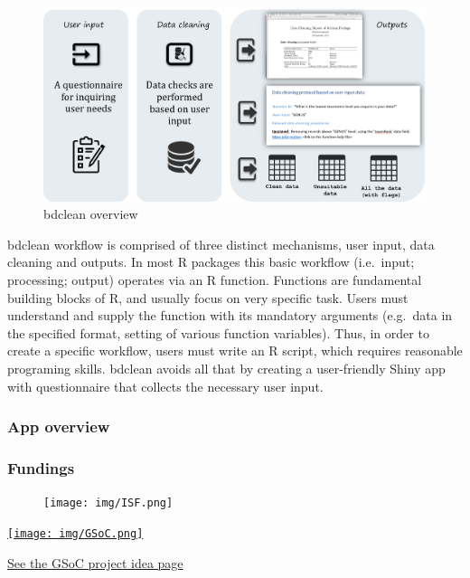 \documentclass[]{book}
\begin{document}
\begin{figure}
\centering
\includegraphics{img/bdclean_overview.png}
\caption{bdclean overview}
\end{figure}

bdclean workflow is comprised of three distinct mechanisms, user input,
data cleaning and outputs. In most R packages this basic workflow
(i.e.~input; processing; output) operates via an R function. Functions
are fundamental building blocks of R, and usually focus on very specific
task. Users must understand and supply the function with its mandatory
arguments (e.g.~data in the specified format, setting of various
function variables). Thus, in order to create a specific workflow, users
must write an R script, which requires reasonable programing skills.
bdclean avoids all that by creating a user-friendly Shiny app with
questionnaire that collects the necessary user input.

\subsubsection*{App overview}\label{app-overview}

\subsubsection*{Fundings}\label{fundings}

\begin{figure}
\centering
\texttt{[image: img/ISF.png]}
\caption{}
\end{figure}

\href{https://summerofcode.withgoogle.com/\%20target=\%22_blank\%22}{\texttt{[image: img/GSoC.png]}}

\href{https://github.com/rstats-gsoc/gsoc2018/wiki/bdclean\%3A-User-friendly-biodiversity-data-cleaning-pipeline\%20target=\%22_blank\%22}{See
the GSoC project idea page}
\end{document}
